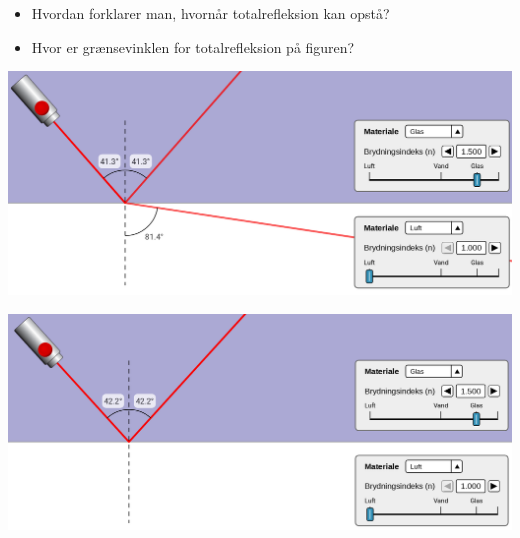 \documentclass[a4paper, 12pt]{article}
\begin{document}
\begin{minipage}{0.3\linewidth}
\begin{itemize}
\item Hvordan forklarer man, hvornår totalrefleksion kan opstå?
\item Hvor er grænsevinklen for totalrefleksion på figuren?
\end{itemize}
\end{minipage}
\vline
\begin{minipage}{0.68\linewidth}
\begin{center}
\includegraphics[width=.9\linewidth]{./img/totalrefleksion_1.png}
\end{center}
\begin{center}
\includegraphics[width=.9\linewidth]{./img/totalrefleksion_2.png}
\end{center}
\end{minipage}


\vfill
\end{document}
